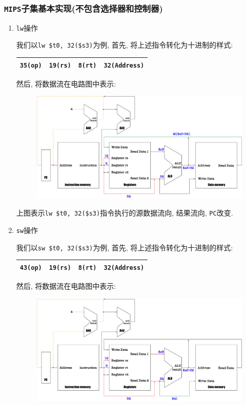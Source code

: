 \subsubsection{\texttt{MIPS}子集基本实现(不包含选择器和控制器)}
\begin{enumerate}
\item \texttt{lw}操作 \par
我们以\verb|lw $t0, 32($s3)|为例, 首先, 将上述指令转化为十进制的样式:
\begin{table}[H]
\centering
\begin{tabularx}{\textwidth}{|Z|Z|Z|Z|}
\hline
\verb|35(op)| & \verb|19(rs)| & \verb|8(rt)| & \verb|32(Address)| \\
\hline
\end{tabularx}
\end{table}
然后, 将数据流在电路图中表示:
\begin{figure}[H]
\centering
\includegraphics[scale=.3]{img/figure26.pdf}
\end{figure}
上图表示\verb|lw $t0, 32($s3)|指令执行的\textcolor{myred}{源数据流向}, \textcolor{mygreen}{结果流向}, \textcolor{myyellow}{\texttt{PC}改变}.
\item \texttt{sw}操作 \par
我们以\verb|sw $t0, 32($s3)|为例, 首先, 将上述指令转化为十进制的样式:
\begin{table}[H]
\centering
\begin{tabularx}{\textwidth}{|Z|Z|Z|Z|}
\hline
\verb|43(op)| & \verb|19(rs)| & \verb|8(rt)| & \verb|32(Address)| \\
\hline
\end{tabularx}
\end{table}
然后, 将数据流在电路图中表示:
\begin{figure}[H]
\centering
\includegraphics[scale=.3]{img/figure27.pdf}

\end{figure}
\end{enumerate}
